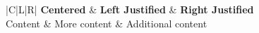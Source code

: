 \begin{table}[htb]
	\centering
	\begin{tabularx}{\linewidth}{|C|L|R|}
		\hline
		\textbf{Centered} & \textbf{Left Justified} & \textbf{Right Justified} \\
		\hline
		Content & More content & Additional content \\
		\hline
	\end{tabularx}
	\caption{Example Table with Tabularx}
	\label{tab:example}
\end{table}